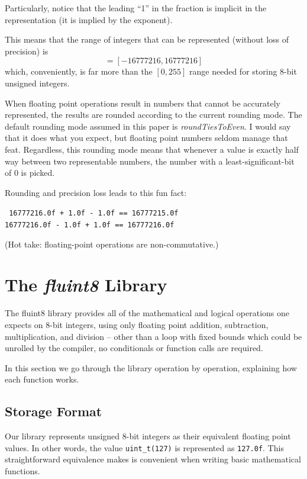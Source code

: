\documentclass{acmsiggraph}
\theoremstyle{remark}
\theoremstyle{definition}
\begin{document}
Particularly, notice that the leading ``1'' in the fraction is implicit in the representation (it is implied by the exponent).

This means that the range of integers that can be represented (without loss of precision) is
\begin{displaymath}
[-2^{24},2^{24}] = [-16777216, 16777216]
\end{displaymath}
which, conveniently, is far more than the $[0,255]$ range needed for storing 8-bit unsigned integers.

When floating point operations result in numbers that cannot be accurately represented, the results are rounded according to the current rounding mode.
The default rounding mode assumed in this paper is {\em roundTiesToEven}.
I would say that it does what you expect, but floating point numbers seldom manage that feat.
Regardless, this rounding mode means that whenever a value is exactly half way between two representable numbers, the number with a least-significant-bit of 0 is picked.

Rounding and precision loss leads to this fun fact:
\begin{center} \tt
16777216.0f + 1.0f - 1.0f == 16777215.0f\\
16777216.0f - 1.0f + 1.0f == 16777216.0f
\end{center}
(Hot take: floating-point operations are non-commutative.)

\section{The {\em fluint8} Library}
The fluint8 library provides all of the mathematical and logical operations one expects on 8-bit integers, using only floating point addition, subtraction, multiplication, and division --
other than a loop with fixed bounds which could be unrolled by the compiler, no conditionals or function calls are required.

In this section we go through the library operation by operation, explaining how each function works.

\subsection{Storage Format}
Our library represents unsigned 8-bit integers as their equivalent floating point values.
In other words, the value {\tt uint\_t(127)} is represented as {\tt 127.0f}.
This straightforward equivalence makes is convenient when writing basic mathematical functions.
\end{document}
